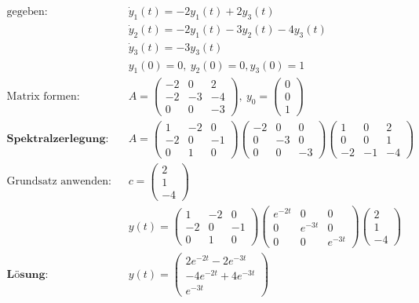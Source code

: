 \documentclass[11pt]{article}
\begin{document}
\begin{equation*}
\begin{split}
	\text{gegeben:} \quad & \dot y_1 (t) = -2y_1(t) + 2y_3(t) \\
	& \dot y_2(t) = -2y_1(t) - 3y_2(t) - 4y_3(t) \\
	& \dot y_3(t) = -3y_3(t) \\
	& y_1(0) = 0,\ y_2(0) = 0, y_3(0) = 1 \\
	\text{Matrix formen:} \quad & A = \begin{pmatrix}
		-2 & 0 & 2 \\ -2 & -3 & -4 \\ 0 & 0 & -3
	\end{pmatrix},\ y_0 = \begin{pmatrix} 0 \\ 0 \\ 1 \end{pmatrix} \\
	\textbf{Spektralzerlegung:}\quad & A = \begin{pmatrix}
		1 & -2 & 0 \\ -2 & 0 & -1 \\ 0 & 1 & 0
	\end{pmatrix}\begin{pmatrix}
		-2 & 0 & 0 \\ 0 & -3 & 0 \\ 0 & 0 & -3
	\end{pmatrix}\begin{pmatrix}
		1 & 0 & 2 \\ 0 & 0 & 1 \\ -2 & -1 & -4
	\end{pmatrix} \\
	\text{Grundsatz anwenden:}\quad & c = \begin{pmatrix}
		2 \\ 1 \\ -4
	\end{pmatrix} \\
	& y(t) = \begin{pmatrix}
		1 & -2 & 0 \\ -2 & 0 & -1 \\ 0 & 1 & 0
	\end{pmatrix} \begin{pmatrix}
		e^{-2t} & 0 & 0 \\ 0 & e^{-3t} & 0 \\ 0 & 0 & e^{-3t}
	\end{pmatrix}\begin{pmatrix}
		2 \\ 1 \\ -4
	\end{pmatrix} \\
	\textbf{L{\"o}sung:} \quad & y(t) = \begin{pmatrix}
		2e^{-2t}-2e^{-3t} \\ -4e^{-2t} + 4 e^{-3t} \\ e^{-3t}
	\end{pmatrix}
\end{split}
\end{equation*}
\end{document}
